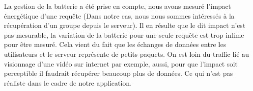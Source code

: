 La gestion de la batterie a été prise en compte, nous avons mesuré l'impact énergétique d'une requête (Dans notre cas, nous nous
sommes intéressés à la récupération d'un groupe depuis le serveur). Il en résulte que le dit impact n'est pas mesurable, la
variation de la batterie pour une seule requête est trop infime pour être mesuré. Cela vient du fait que les échanges de données
entre les utilisateurs et le serveur représente de petits paquets. On est loin du traffic lié au visionnage d'une vidéo sur
internet par exemple, aussi, pour que l'impact soit perceptible il faudrait récupérer beaucoup plus de données. Ce qui n'est pas
réaliste dans le cadre de notre application.
